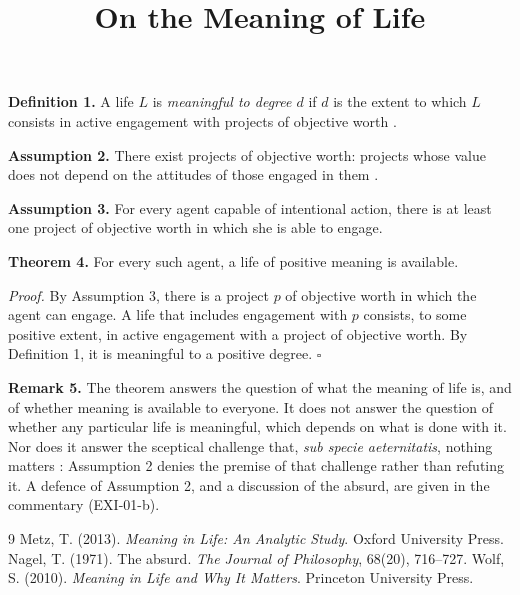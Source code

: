 \documentclass{situationist-preprint}
\title{On the Meaning of Life}
\begin{document}
\maketitle
\vspace{-1em}

\noindent\textbf{Definition 1.} A life $L$ is \emph{meaningful to degree $d$} if $d$ is the extent to which $L$ consists in active engagement with projects of objective worth \citep{Wolf2010}.

\medskip\noindent\textbf{Assumption 2.} There exist projects of objective worth: projects whose value does not depend on the attitudes of those engaged in them \citep{Metz2013}.

\medskip\noindent\textbf{Assumption 3.} For every agent capable of intentional action, there is at least one project of objective worth in which she is able to engage.

\medskip\noindent\textbf{Theorem 4.} For every such agent, a life of positive meaning is available.

\medskip\noindent\textit{Proof.} By Assumption 3, there is a project $p$ of objective worth in which the agent can engage. A life that includes engagement with $p$ consists, to some positive extent, in active engagement with a project of objective worth. By Definition 1, it is meaningful to a positive degree. \hfill$\square$

\medskip\noindent\textbf{Remark 5.} The theorem answers the question of what the meaning of life is, and of whether meaning is available to everyone. It does not answer the question of whether any particular life is meaningful, which depends on what is done with it. Nor does it answer the sceptical challenge that, \emph{sub specie aeternitatis}, nothing matters \citep{Nagel1971}: Assumption 2 denies the premise of that challenge rather than refuting it. A defence of Assumption 2, and a discussion of the absurd, are given in the commentary (EXI-01-b).

\begin{thebibliography}{9}\small
{} Metz, T. (2013). \emph{Meaning in Life: An Analytic Study}. Oxford University Press.
 Nagel, T. (1971). The absurd. \emph{The Journal of Philosophy}, 68(20), 716--727.
 Wolf, S. (2010). \emph{Meaning in Life and Why It Matters}. Princeton University Press.
\end{thebibliography}
\end{document}
